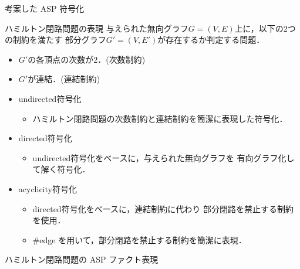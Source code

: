 \documentclass[dvipdfmx,10pt]{beamer}
\begin{document}
\begin{frame}{考案した ASP 符号化}
  \begin{block}{ハミルトン閉路問題の表現}
    与えられた無向グラフ$G= (V,E)$上に，以下の2つの制約を満たす
    部分グラフ$G'= (V,E')$が存在するか判定する問題．
    \begin{itemize}
    \item $G'$の各頂点の次数が2．(\alert{次数制約})
    \item $G'$が連結．(\alert{連結制約})
    \end{itemize}
  \end{block}
  \begin{itemize}
  \item \alert{\textsf{undirected}符号化}
    \begin{itemize}
    \item ハミルトン閉路問題の次数制約と連結制約を簡潔に表現した符号化．
    \end{itemize}
  \item \alert{\textsf{directed}符号化}
    \begin{itemize}
    \item \textsf{undirected}符号化をベースに，与えられた無向グラフを
      有向グラフ化して解く符号化．
    \end{itemize}
  \item \alert{\textsf{acyclicity}符号化}
    \begin{itemize}
    \item \textsf{directed}符号化をベースに，連結制約に代わり
      部分閉路を禁止する制約を使用．
      \item \#edge を用いて，部分閉路を禁止する制約を簡潔に表現．
    \end{itemize}
  \end{itemize}
\end{frame}
\begin{frame}{ハミルトン閉路問題の ASP ファクト表現}
\begin{figure}[t]
\begin{center}

\end{center}
\end{figure}

\begin{exampleblock}{}
 
\end{exampleblock}
\end{frame}
\end{document}
